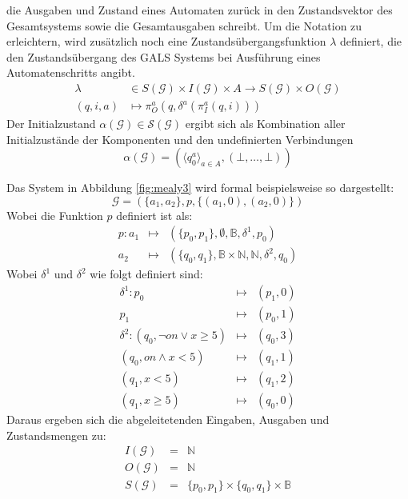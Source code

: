 die Ausgaben und Zustand eines Automaten zurück in den Zustandsvektor des Gesamtsystems sowie die Gesamtausgaben schreibt.
Um die Notation zu erleichtern, wird zusätzlich noch eine Zustandsübergangsfunktion $\lambda$ definiert, die den Zustandsübergang des GALS Systems bei Ausführung eines Automatenschritts angibt.
\begin{align*}
  \lambda &\in S(\mathcal{G})\times I(\mathcal{G})\times A\rightarrow S(\mathcal{G})\times O(\mathcal{G})\\
  (q,i,a) &\mapsto \pi_O^a(q,\delta^a(\pi_I^a(q,i)))
\end{align*}
Der Initialzustand $\alpha(\mathcal{G})\in\mathcal{S}(\mathcal{G})$ ergibt sich als Kombination aller Initialzustände der Komponenten und den undefinierten Verbindungen
\[ \alpha(\mathcal{G}) = (\langle q_0^a\rangle_{a\in A},(\bot,\dots,\bot)) \]

Das System in Abbildung \ref{fig:mealy3} wird formal beispielsweise so dargestellt:
\[ \mathcal{G} = (\{a_1,a_2\},p,\{ (a_1,0),(a_2,0) \}) \]
Wobei die Funktion $p$ definiert ist als:
\begin{eqnarray*}
  p : a_1&\mapsto& (\{p_0,p_1\},\emptyset,\mathbb{B},\delta^1,p_0)\\
      a_2&\mapsto& (\{q_0,q_1\},\mathbb{B}\times\mathbb{N},\mathbb{N},\delta^2,q_0)
\end{eqnarray*}
Wobei $\delta^1$ und $\delta^2$ wie folgt definiert sind:
\begin{eqnarray*}
  \delta^1 : p_0 &\mapsto& (p_1,0)\\
             p_1 &\mapsto& (p_0,1)\\
  \delta^2 : (q_0,\lnot\mathit{on}\lor x\geq 5) &\mapsto& (q_0,3)\\
             (q_0,\mathit{on}\land x<5) &\mapsto& (q_1,1)\\
             (q_1,x<5) &\mapsto& (q_1,2)\\
             (q_1,x\geq 5) &\mapsto& (q_0,0)
\end{eqnarray*}
Daraus ergeben sich die abgeleitetenden Eingaben, Ausgaben und Zustandsmengen zu:
\begin{eqnarray*}
  I(\mathcal{G}) &=& \mathbb{N}\\
  O(\mathcal{G}) &=& \mathbb{N}\\
  S(\mathcal{G}) &=& \{p_0,p_1\}\times\{q_0,q_1\}\times\mathbb{B}
\end{eqnarray*}

